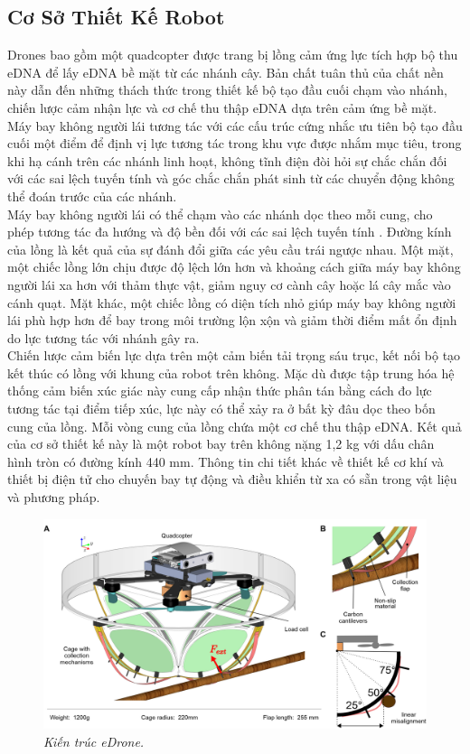 \documentclass[12pt,a4paper]{article}
\begin{document}
\subsection{Cơ Sở Thiết Kế Robot}
Drones bao gồm một quadcopter được trang bị lồng cảm ứng lực tích hợp bộ thu eDNA để lấy eDNA bề mặt từ các nhánh cây. Bản chất tuân thủ của chất nền này dẫn đến những thách thức trong thiết kế bộ tạo đầu cuối chạm vào nhánh, chiến lược cảm nhận lực và cơ chế thu thập eDNA dựa trên cảm ứng bề mặt. Máy bay không người lái tương tác với các cấu trúc cứng nhắc ưu tiên bộ tạo đầu cuối một điểm để định vị lực tương tác trong khu vực được nhắm mục tiêu, trong khi hạ cánh trên các nhánh linh hoạt, không tĩnh điện đòi hỏi sự chắc chắn đối với các sai lệch tuyến tính và góc chắc chắn phát sinh từ các chuyển động không thể đoán trước của các nhánh.\\
\linebreak
Máy bay không người lái có thể chạm vào các nhánh dọc theo mỗi cung, cho phép tương tác đa hướng và độ bền đối với các sai lệch tuyến tính . Đường kính của lồng là kết quả của sự đánh đổi giữa các yêu cầu trái ngược nhau. Một mặt, một chiếc lồng lớn chịu được độ lệch lớn hơn và khoảng cách giữa máy bay không người lái xa hơn với thảm thực vật, giảm nguy cơ cành cây hoặc lá cây mắc vào cánh quạt. Mặt khác, một chiếc lồng có diện tích nhỏ giúp máy bay không người lái phù hợp hơn để bay trong môi trường lộn xộn và giảm thời điểm mất ổn định do lực tương tác với nhánh gây ra.\\
\linebreak
Chiến lược cảm biến lực dựa trên một cảm biến tải trọng sáu trục, kết nối bộ tạo kết thúc có lồng với khung của robot trên không. Mặc dù được tập trung hóa hệ thống cảm biến xúc giác này cung cấp nhận thức phân tán bằng cách đo lực tương tác tại điểm tiếp xúc, lực này có thể xảy ra ở bất kỳ đâu dọc theo bốn cung của lồng. Mỗi vòng cung của lồng chứa một cơ chế thu thập eDNA. Kết quả của cơ sở thiết kế này là một robot bay trên không nặng 1,2 kg với dấu chân hình tròn có đường kính 440 mm. Thông tin chi tiết khác về thiết kế cơ khí và thiết bị điện tử cho chuyến bay tự động và điều khiển từ xa có sẵn trong vật liệu và phương pháp.\\
\begin{figure}
    \centering
    \includegraphics[scale = 0.9]{hinh 2}
    \caption{\textit{Kiến trúc eDrone.}}
    \label{fig2}
\end{figure}
\end{document}
